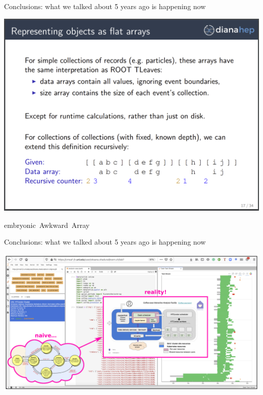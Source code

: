 \documentclass[aspectratio=169]{beamer}
\begin{document}
\begin{frame}{Conclusions: what we talked about 5 years ago is happening now}
\vspace{0.15 cm}
\begin{center}
\includegraphics[width=0.73\linewidth]{PLOTS/awkward-in-2017.png}
\end{center}

\vspace{-1.25 cm}
\hfill \mbox{embryonic Awkward Array\hspace{-0.5 cm}}
\vspace{1.25 cm}
\end{frame}

\begin{frame}{Conclusions: what we talked about 5 years ago is happening now}
\vspace{0.5 cm}

\includegraphics[width=\linewidth]{PLOTS/af-dream-to-reality.pdf}
\end{frame}
\end{document}
